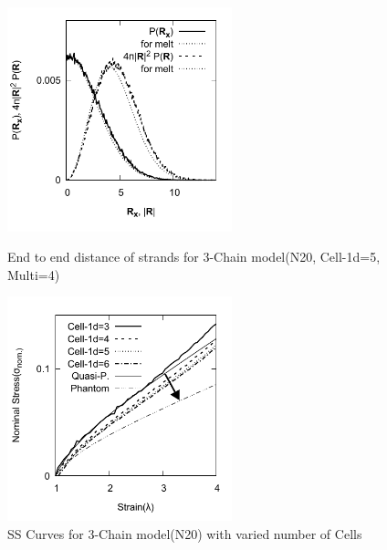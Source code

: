 \documentclass[11pt]{jsarticle}
\begin{document}
\begin{figure}[hb]
\begin{minipage}{0.5\hsize}
	\begin{center}
	\includegraphics[width=65mm]{./fig/PR_BW.pdf}
	\caption{End to end distance of strands for 3-Chain model(N20, Cell-1d=5, Multi=4)}
	\label{fig:e2e}
	\end{center}
\end{minipage}
\begin{minipage}{0.5\hsize}
	\begin{center}
	\includegraphics[width=65mm]{./fig/SS_all_BW.pdf}
	\caption{SS Curves for 3-Chain model(N20) with varied number of Cells}
	\label{fig:SS_cells}
	\end{center}
\end{minipage}
\end{figure}
\vspace{-3mm}




\end{document}

